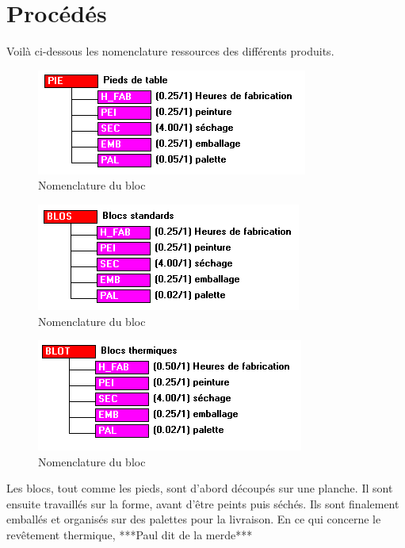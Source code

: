 \section{Procédés}

Voilà ci-dessous les nomenclature ressources des différents produits.

	\begin{figure}[H]
\centering
\includegraphics[scale=0.35]{./captures/pied.PNG}
\caption{Nomenclature du bloc}
	\end{figure}	
	
		\begin{figure}[H]
\centering
\includegraphics[scale=0.35]{./captures/standard.PNG}
\caption{Nomenclature du bloc}
	\end{figure}	
	
	
		\begin{figure}[H]
\centering
\includegraphics[scale=0.35]{./captures/thermique.PNG}
\caption{Nomenclature du bloc}
	\end{figure}	

Les blocs, tout comme les pieds, sont d'abord découpés sur une planche. Il sont ensuite travaillés sur la forme, avant d'être peints puis séchés. Ils sont finalement emballés et organisés sur des palettes pour la livraison.
En ce qui concerne le revêtement thermique, ***Paul dit de la merde***